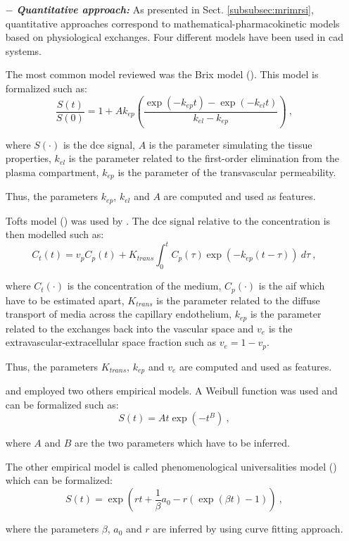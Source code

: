 \begin{enumerate}[leftmargin=*]
\item[$-$] \textbf{\textit{Quantitative approach:}} As presented in Sect. \ref{subsubsec:mrimrsi}, quantitative approaches correspond to mathematical-pharmacokinetic models based on physiological exchanges. Four different models have been used in \ac{cad} systems. 

The most common model reviewed was the Brix model (\cite{Artan2009,Artan2010,Sung2011,Liu2009,Ozer2009,Ozer2010}). This model is formalized such as:
\begin{equation}
	\frac{S(t)}{S(0)} = 1 + A k_{ep} \left( \frac{\exp( -k_{ep} t ) - \exp( -k_{el} t )}{k_{el} - k_{ep}} \right) \ ,
	\label{eq:brixmod}
\end{equation}

\noindent where $S(\cdot)$ is the \ac{dce} signal, $A$ is the parameter simulating the tissue properties, $k_{el}$ is the parameter related to the first-order elimination from the plasma compartment, $k_{ep}$ is the parameter of the transvascular permeability.

Thus, the parameters $k_{ep}$, $k_{el}$ and $A$ are computed and used as features.

Tofts model (\cite{Tofts1997}) was used by \cite{Langer2009,Giannini2013,Niaf2011,Niaf2012,Mazzetti2011}. The \ac{dce} signal relative to the concentration is then modelled such as:
\begin{equation}
	C_t(t) = v_p C_p(t) + K_{trans} \int_{0}^{t} C_p(\tau) \exp( -k_{ep}(t-\tau) ) \ d\tau \ ,
	\label{eq:tofts} 
\end{equation}

\noindent where $C_t(\cdot)$ is the concentration of the medium, $C_p(\cdot)$ is the \ac{aif} which have to be estimated apart, $K_{trans}$ is the parameter related to the diffuse transport of media across the capillary endothelium, $k_{ep}$ is the parameter related to the exchanges back into the vascular space and $v_e$ is the extravascular-extracellular space fraction such as $v_e = 1 - v_p$. 

Thus, the parameters $K_{trans}$, $k_{ep}$ and $v_e$ are computed and used as features.

\cite{Mazzetti2011} and \cite{Giannini2013} employed two others empirical models. A Weibull function was used and can be formalized such as:
\begin{equation}
	S(t) = A t \exp( -t^{B} ) \ ,
	\label{eq:weibull}
\end{equation}

\noindent where $A$ and $B$ are the two parameters which have to be inferred.

The other empirical model is called phenomenological universalities model (\cite{Castorina2006}) which can be formalized:
\begin{equation}
	S(t) = \exp \left( r t + \frac{1}{\beta} a_0 - r ( \exp( \beta t ) - 1 ) \right) \ ,
	\label{eq:pun}
\end{equation}

\noindent where the parameters $\beta$, $a_0$ and $r$ are inferred by using curve fitting approach.

\end{enumerate}

